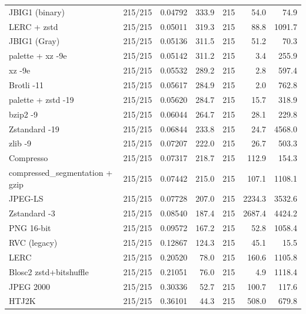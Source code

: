 \begin{table}[t]
\begin{tabular}{lrrrrrr}
JBIG1 (binary) & 215/215 & 0.04792 & 333.9 & 215 & 54.0 & 74.9 \\
LERC + zstd & 215/215 & 0.05011 & 319.3 & 215 & 88.8 & 1091.7 \\
JBIG1 (Gray) & 215/215 & 0.05136 & 311.5 & 215 & 51.2 & 70.3 \\
palette + xz -9e & 215/215 & 0.05142 & 311.2 & 215 & 3.4 & 255.9 \\
xz -9e & 215/215 & 0.05532 & 289.2 & 215 & 2.8 & 597.4 \\
Brotli -11 & 215/215 & 0.05617 & 284.9 & 215 & 2.0 & 762.8 \\
palette + zstd -19 & 215/215 & 0.05620 & 284.7 & 215 & 15.7 & 318.9 \\
bzip2 -9 & 215/215 & 0.06044 & 264.7 & 215 & 28.1 & 229.8 \\
Zstandard -19 & 215/215 & 0.06844 & 233.8 & 215 & 24.7 & 4568.0 \\
zlib -9 & 215/215 & 0.07207 & 222.0 & 215 & 26.7 & 503.3 \\
Compresso & 215/215 & 0.07317 & 218.7 & 215 & 112.9 & 154.3 \\
compressed\_segmentation + gzip & 215/215 & 0.07442 & 215.0 & 215 & 107.1 & 1108.1 \\
JPEG-LS & 215/215 & 0.07728 & 207.0 & 215 & 2234.3 & 3532.6 \\
Zstandard -3 & 215/215 & 0.08540 & 187.4 & 215 & 2687.4 & 4424.2 \\
PNG 16-bit & 215/215 & 0.09572 & 167.2 & 215 & 52.8 & 1058.4 \\
RVC (legacy) & 215/215 & 0.12867 & 124.3 & 215 & 45.1 & 15.5 \\
LERC & 215/215 & 0.20520 & 78.0 & 215 & 160.6 & 1105.8 \\
Blosc2 zstd+bitshuffle & 215/215 & 0.21051 & 76.0 & 215 & 4.9 & 1118.4 \\
JPEG 2000 & 215/215 & 0.30336 & 52.7 & 215 & 100.7 & 117.6 \\
HTJ2K & 215/215 & 0.36101 & 44.3 & 215 & 508.0 & 679.8 \\
\hline
\end{tabular}
\end{table}
